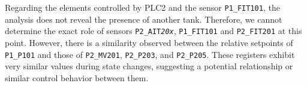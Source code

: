 \bigskip
Regarding the elements controlled by PLC2 and the sensor \texttt{P1\_FIT101}, the analysis does not reveal the presence of another tank. Therefore, we cannot determine the exact role of sensors \texttt{P2\_AIT\textit{20x}}, \texttt{P1\_FIT101} and \texttt{P2\_FIT201} at this point.
However, there is a similarity observed between the relative setpoints of \texttt{P1\_P101} and those of \texttt{P2\_MV201}, \texttt{P2\_P203}, and \texttt{P2\_P205}. These registers exhibit very similar values during state changes, suggesting a potential relationship or similar control behavior between them.

\begin{comment}
\paragraph{Conjecture summarizing} We summarize in Table \ref{table:6_P1P2_summarize_preliminary} the conjectures made in this phase:

\bigskip
{	\footnotesize
	\begin{longtable}[l]{p{0.05\textwidth} p{0.45\textwidth} p{0.45\textwidth}}
		\hline
		\textbf{\#} & \textbf{Statement} & \textbf{Reason} \\
		\hline
		
		C1 & \texttt{P1\_LIT101}, \texttt{P1\_FIT101}, \texttt{P2\_FIT201}, \texttt{P2\_AIT201}, \texttt{P2\_AIT202}, \texttt{P2\_AIT203} are \textbf{measurements}. & Registers contain continuous numerical values.\\
		\hline
		
		C2 & \texttt{P1\_LIT101} is identified as the \textbf{level sensor} specifically associated with a \textbf{tank} & Sensor has a wide range of values (minimum 489, maximum value of 815).\\
		\hline
		
		C3 & \texttt{P1\_MV101}, \texttt{P1\_P101}, \texttt{P2\_MV201}, \texttt{P2\_P203} and \texttt{P2\_P205} are \textbf{actuators}. & Registers contain discrete numerical values.\\
		\hline
		
		C4 & \texttt{P1\_MV101} and \texttt{P2\_MV201} assume three distinct states, represented by the values 0, 1, and 2. They can be identified as \textbf{valves}.& Observation derived from output and point 3 of the third premise in Section \ref{par:6_conventions}\\
		\hline
		
		C5 & \texttt{P1\_P101}, \texttt{P2\_P203} and \texttt{P2\_P205} assume two distinct states, represented by the values 1, and 2. They can be identified as \textbf{pumps}. & Observation derived from output and point 3 of the third premise in Section \ref{par:6_conventions}\\
		\hline
		

\end{comment}
